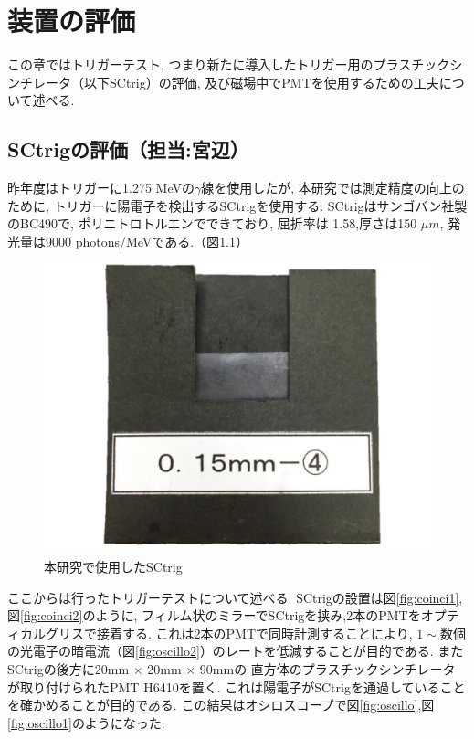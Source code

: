 \chapter{装置の評価}
\label{SCtrig}


この章ではトリガーテスト,
つまり新たに導入したトリガー用のプラスチックシンチレータ（以下SCtrig）の評価,
及び磁場中でPMTを使用するための工夫について述べる.

\section{SCtrigの評価（担当:宮辺）}


昨年度はトリガーに1.275 MeVの$\gamma$線を使用したが,
本研究では測定精度の向上のために,
トリガーに陽電子を検出するSCtrigを使用する.
SCtrigはサンゴバン社製のBC490で,
ポリニトロトルエンでできており,
屈折率は 1.58,厚さは150 $\si{\mu m}$,
発光量は9000 photons/MeVである.（図\ref{fig:SCtrig}）

\begin{figure}[H]
\centering
\includegraphics[keepaspectratio,scale=0.3]{fig/ybm/SCtrig.pdf}
\caption{本研究で使用したSCtrig}
\label{fig:SCtrig}
\end{figure}

ここからは行ったトリガーテストについて述べる.
SCtrigの設置は図\ref{fig:coinci1},図\ref{fig:coinci2}のように,
フィルム状のミラーでSCtrigを挟み,2本のPMTをオプティカルグリスで接着する.
これは2本のPMTで同時計測することにより,
$1\sim 数個$の光電子の暗電流（図\ref{fig:oscillo2}）のレートを低減することが目的である.
またSCtrigの後方に20mm $\times$ 20mm $\times$ 90mmの
直方体のプラスチックシンチレータが取り付けられたPMT H6410を置く.
これは陽電子がSCtrigを通過していることを確かめることが目的である.
この結果はオシロスコープで図\ref{fig:oscillo},図\ref{fig:oscillo1}のようになった.


